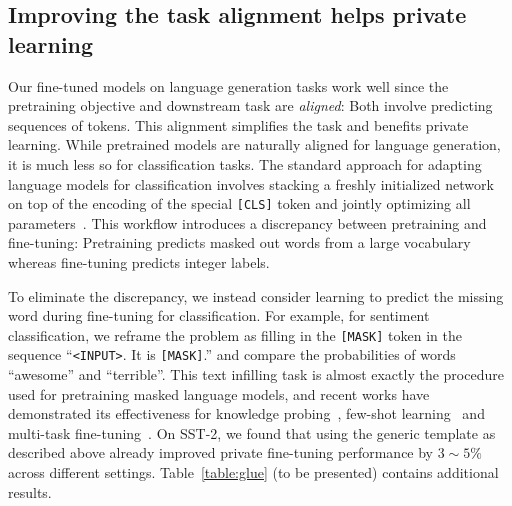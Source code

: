 


\subsection{Improving the task alignment helps private learning}\label{sec:task_alignment}
Our fine-tuned models on language generation tasks work well since the pretraining objective and downstream task are \emph{aligned}: Both involve predicting sequences of tokens.
This alignment simplifies the task and benefits private learning. 
While pretrained models are naturally aligned for language generation, it is much less so for classification tasks. The standard approach for adapting language models for classification involves stacking a freshly initialized network on top of the encoding of the special \texttt{[CLS]} token and jointly optimizing all parameters~\citep{devlin2018bert}. 
This workflow introduces a discrepancy between pretraining and fine-tuning: Pretraining predicts masked out words from a large vocabulary whereas fine-tuning predicts integer labels.

To eliminate the discrepancy, we instead consider learning to predict the missing word during fine-tuning for classification. 
For example, for sentiment classification, we reframe the problem as filling in the \texttt{[MASK]} token in the sequence ``\texttt{<INPUT>}. It is \texttt{[MASK]}.'' and compare the probabilities of words ``awesome'' and ``terrible''.
This text infilling task is almost exactly the procedure used for pretraining masked language models, and recent works have demonstrated its effectiveness for knowledge probing~\citep{petroni2019language}, few-shot learning~\citep{gao2020making} and multi-task fine-tuning~\citep{wei2021finetuned}. 
On SST-2, we found that using the generic template as described above already improved private fine-tuning performance by $3\sim5\%$ across different settings.
Table~\ref{table:glue} (to be presented) contains additional results.
